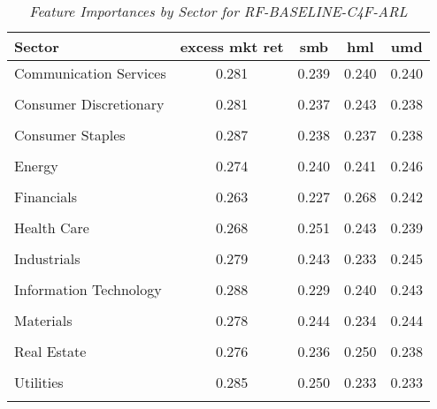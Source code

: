             \begin{table}[ht]
            \centering
            \caption{\textit{Feature Importances by Sector for RF-BASELINE-C4F-ARL}}
            \label{tab:feature_importance_rf-baseline-c4f-arl}
            \begin{tabular}{lcccc}
            \toprule
            Sector & excess mkt ret & smb & hml & umd \\
            \midrule
            Communication Services & 0.281 & 0.239 & 0.240 & 0.240 \\\\
Consumer Discretionary & 0.281 & 0.237 & 0.243 & 0.238 \\\\
Consumer Staples & 0.287 & 0.238 & 0.237 & 0.238 \\\\
Energy & 0.274 & 0.240 & 0.241 & 0.246 \\\\
Financials & 0.263 & 0.227 & 0.268 & 0.242 \\\\
Health Care & 0.268 & 0.251 & 0.243 & 0.239 \\\\
Industrials & 0.279 & 0.243 & 0.233 & 0.245 \\\\
Information Technology & 0.288 & 0.229 & 0.240 & 0.243 \\\\
Materials & 0.278 & 0.244 & 0.234 & 0.244 \\\\
Real Estate & 0.276 & 0.236 & 0.250 & 0.238 \\\\
Utilities & 0.285 & 0.250 & 0.233 & 0.233 \\\\
            \bottomrule
            \end{tabular}%
            \end{table}